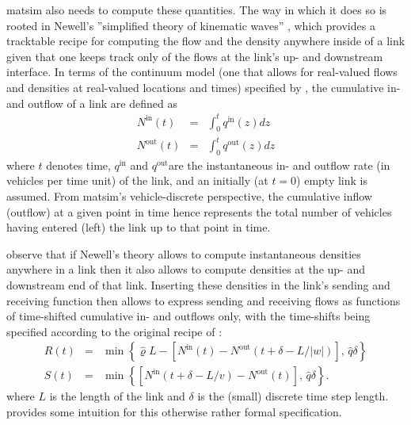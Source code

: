 \gls{matsim} also needs to compute these quantities. The way in which it
does so is rooted in Newell's {}''simplified theory of kinematic
waves'' \citep{newell-1993}, which provides a tracktable recipe for
computing the flow and the density anywhere inside of a link given
that one keeps track only of the flows at the link's up- and
downstream interface. In terms of the continuum model (\ie one that
allows for real-valued flows and densities at real-valued locations
and times) specified by \citet{newell-1993}, the cumulative in- and
outflow of a link are defined as
\begin{eqnarray}
N^{\text{in}}(t) & = & \int_{0}^{t}q^{\text{in}}(z)dz\label{eq:cum-in}\\
N^{\text{out}}(t) & = & \int_{0}^{t}q^{\text{out}}(z)dz\label{eq:cum-out}
\end{eqnarray}
where $t$ denotes time, $q^{\text{in}}$ and $q^{\text{out}}$are
the instantaneous in- and outflow rate (in vehicles per time unit)
of the link, and an initially (at $t=0$) empty link is assumed. From
\gls{matsim}'s vehicle-discrete perspective, the cumulative inflow (outflow)
at a given point in time hence represents the total number of vehicles
having entered (left) the link up to that point in time.

\citet{yperman-2006,yperman-phd} observe that if Newell's theory
allows to compute instantaneous densities anywhere in a link then
it also allows to compute densities at the up- and downstream end
of that link. Inserting these densities in the link's sending and
receiving function then allows to express sending and receiving flows
as functions of time-shifted cumulative in- and outflows only, with
the time-shifts being specified according to the original recipe of
\citet{newell-1993}:
\begin{eqnarray}
R(t) & = & \min\left\{ \hat{\varrho}L-\left[N^{\text{in}}(t)-N^{\text{out}}(t+\delta-L/|w|)\right],\,\hat{q}\delta\right\} \label{eq:R-yperman}\\
S(t) & = & \min\left\{ \left[N^{\text{in}}(t+\delta-L/v)-N^{\text{out}}(t)\right],\,\hat{q}\delta\right\} .\label{eq:S-yperman}
\end{eqnarray}
where $L$ is the length of the link and $\delta$ is the (small)
discrete time step length. \citet{yperman-phd} provides some 
intuition for this otherwise rather formal specification.

